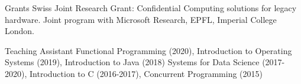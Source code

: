 


\begin{cvskills}

\cvskill
{Grants}
{Swiss Joint Research Grant: Confidential Computing solutions for legacy hardware.\linebreak
  Joint program with Microsoft Research, EPFL, Imperial College London.\linebreak
}


\cvskill
{Teaching Assistant} %
{
  Functional Programming (2020), Introduction to Operating Systems (2019), Introduction to Java (2018)\linebreak
  Systems for Data Science (2017-2020), Introduction to C (2016-2017), Concurrent Programming (2015)
}

\end{cvskills}
